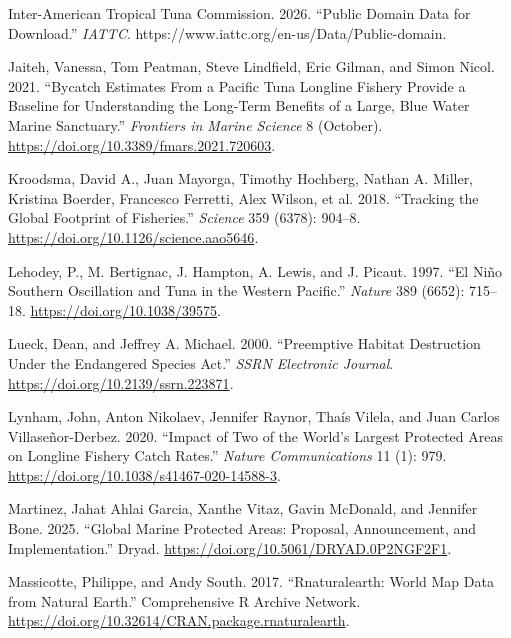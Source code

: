 \documentclass[
  letterpaper,
  DIV=11,
  numbers=noendperiod]{scrartcl}
\newlength{\cslhangindent}
\newenvironment{CSLReferences}[2] %
 {\begin{list}{}{%
  \setlength{\itemindent}{0pt}
  \setlength{\leftmargin}{0pt}
  \setlength{\parsep}{0pt}
  \ifodd #1
   \setlength{\leftmargin}{\cslhangindent}
   \setlength{\itemindent}{-1\cslhangindent}
  \fi
  \setlength{\itemsep}{#2\baselineskip}}}
 {\end{list}}
\begin{document}
\begin{CSLReferences}{1}{0}
Inter-American Tropical Tuna Commission. 2026. {``Public Domain Data for
Download.''} \emph{IATTC}.
https://www.iattc.org/en-us/Data/Public-domain.

Jaiteh, Vanessa, Tom Peatman, Steve Lindfield, Eric Gilman, and Simon
Nicol. 2021. {``Bycatch {Estimates From} a {Pacific Tuna Longline
Fishery Provide} a {Baseline} for {Understanding} the {Long-Term
Benefits} of a {Large}, {Blue Water Marine Sanctuary}.''}
\emph{Frontiers in Marine Science} 8 (October).
\url{https://doi.org/10.3389/fmars.2021.720603}.

Kroodsma, David A., Juan Mayorga, Timothy Hochberg, Nathan A. Miller,
Kristina Boerder, Francesco Ferretti, Alex Wilson, et al. 2018.
{``Tracking the Global Footprint of Fisheries.''} \emph{Science} 359
(6378): 904--8. \url{https://doi.org/10.1126/science.aao5646}.

Lehodey, P., M. Bertignac, J. Hampton, A. Lewis, and J. Picaut. 1997.
{``El {Niño Southern Oscillation} and Tuna in the Western {Pacific}.''}
\emph{Nature} 389 (6652): 715--18. \url{https://doi.org/10.1038/39575}.

Lueck, Dean, and Jeffrey A. Michael. 2000. {``Preemptive {Habitat
Destruction Under} the {Endangered Species Act}.''} \emph{SSRN
Electronic Journal}. \url{https://doi.org/10.2139/ssrn.223871}.

Lynham, John, Anton Nikolaev, Jennifer Raynor, Thaís Vilela, and Juan
Carlos Villaseñor-Derbez. 2020. {``Impact of Two of the World's Largest
Protected Areas on Longline Fishery Catch Rates.''} \emph{Nature
Communications} 11 (1): 979.
\url{https://doi.org/10.1038/s41467-020-14588-3}.

Martinez, Jahat Ahlai Garcia, Xanthe Vitaz, Gavin McDonald, and Jennifer
Bone. 2025. {``Global {Marine Protected Areas}: {Proposal},
Announcement, and Implementation.''} Dryad.
\url{https://doi.org/10.5061/DRYAD.0P2NGF2F1}.

Massicotte, Philippe, and Andy South. 2017. {``Rnaturalearth: {World Map
Data} from {Natural Earth}.''} Comprehensive R Archive Network.
\url{https://doi.org/10.32614/CRAN.package.rnaturalearth}.


\end{CSLReferences}
\end{document}

